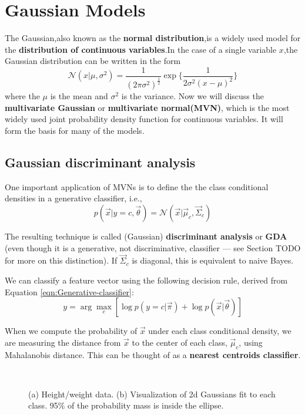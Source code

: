 \chapter{Gaussian Models}
\label{chap:Gaussian Models}
The Gaussian,also known as the \textbf{normal distribution},is a widely used model for the \textbf{distribution of continuous variables}.In the case of a single variable $x$,the Gaussian distribution can be written in the form
\begin{equation}
	\mathcal{N}(x|\mu,\sigma^2) = \dfrac{1}{(2\pi\sigma^2)^{\frac{1}{2}}}\exp\{\dfrac{1}{2\sigma^2 (x-\mu)^2} \}
\end{equation}
where the $\mu$ is the mean and $\sigma^2$ is the variance.
Now we will discuss the \textbf{multivariate Gaussian} or \textbf{multivariate normal(MVN)}, which is the most widely used joint probability density function for continuous variables. It will form the basis for many of the models.


\section{Gaussian discriminant analysis}
One important application of MVNs is to define the the class conditional densities in a generative classifier, i.e.,
\begin{equation}
p(\vec{x}|y=c,\vec{\theta})=\mathcal{N}(\vec{x}|\vec{\mu}_c,\vec{\Sigma}_c)
\end{equation}

The resulting technique is called (Gaussian) \textbf{discriminant analysis} or \textbf{GDA} (even though it is a generative, not discriminative, classifier — see Section TODO for more on this distinction). If $\vec{\Sigma}_c$ is diagonal, this is equivalent to naive Bayes.

We can classify a feature vector using the following decision rule, derived from Equation \ref{eqn:Generative-classifier}:
\begin{equation}
y=\arg\max_{c} \left[\log p(y=c|\vec{\pi})+\log p(\vec{x}|\vec{\theta})\right]
\end{equation}

When we compute the probability of $\vec{x}$ under each class conditional density, we are measuring the distance from $\vec{x}$ to the center of each class, $\vec{\mu}_c$, using Mahalanobis distance. This can be thought of as a \textbf{nearest centroids classifier}.

\begin{figure}[hbtp]
\centering
{} \\
\caption{(a) Height/weight data. (b) Visualization of 2d Gaussians fit to each class. 95\% of the probability mass is inside the ellipse.}
\label{fig:2d-Gaussians-Visualization} 
\end{figure}

